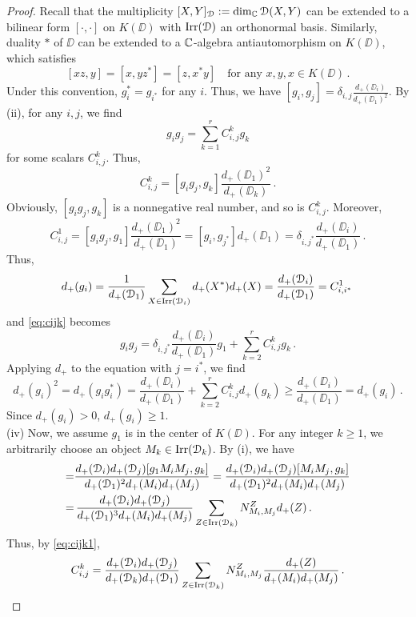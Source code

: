 \documentclass{amsart}
\begin{document}
\begin{proof}
 Recall that the multiplicity $[X,Y]_{\EuScript{D}} := \dim_{\mathbb{C}}{\EuScript{D}}(X,Y)$ can be extended to a bilinear form $[\cdot, \cdot]$ on $K(\DD)$ with $\operatorname{Irr}({\EuScript{D}})$ an orthonormal basis. Similarly,  duality $*$ of $\DD$ can be extended to a $\mathbb{C}$-algebra antiautomorphism on $K(\DD)$, which satisfies
$$
[xz,y] = [x, yz^*] = [z, x^* y] \quad \text{for any }x,y, x \in K(\DD)\,.
$$
Under this convention, $g_i^* = g_{i^*}$ for any $i$. Thus, we have $[g_i, g_j] = \delta_{i,j}\frac{{d_+}(\DD_i)}{{d_+}(\DD_1)^2}$. By (ii), for any $i,j$, we find
\begin{equation} \label{eq:cijk}
g_i g_j = \sum_{k=1}^r C_{i,j}^k g_k
\end{equation}
for some scalars $C_{i,j}^k$. Thus, 
\begin{equation}\label{eq:cijk1}
C_{i,j}^k = [g_i g_j, g_k] \frac{{d_+}(\DD_1)^2} {{d_+}(\DD_k)}\,. 
\end{equation}
Obviously, $[g_i g_j, g_k]$ is a nonnegative real number, and so is $C_{i,j}^k$. Moreover,
\begin{equation} \label{eq:cijk2}
C_{i,j}^1 = [g_i g_j, g_1] \frac{{d_+}(\DD_1)^2} {{d_+}(\DD_1)} =  [g_i, g_{j^*}] {d_+}(\DD_1) = \delta_{i,j^*}\frac{{d_+}(\DD_i)}{{d_+}(\DD_1)}\,.
\end{equation}
Thus, 
$$
d_+(g_i) = \frac{1}{d_+({\EuScript{D}}_1)}\sum_{X \in \operatorname{Irr}({\EuScript{D}}_i)} d_+(X^*)d_+(X) =\frac{d_+({\EuScript{D}}_i)}{d_+({\EuScript{D}}_1)} = C_{i,i^*}^1\,
$$
and  \eqref{eq:cijk} becomes
$$
g_i g_j = \delta_{i, j^*} \frac{{d_+}(\DD_i)}{{d_+}(\DD_1)} g_1+ \sum_{k=2}^r C_{i,j}^k g_k\,.
$$
Applying $d_+$ to the equation with $j=i^*$, we find
$$
d_+(g_i)^2 = d_+(g_i g_i^*) =  \frac{{d_+}(\DD_i)}{{d_+}(\DD_1)} + \sum_{k=2}^r C_{i,j}^k d_+(g_k) \ge \frac{{d_+}(\DD_i)}{{d_+}(\DD_1)}=d_+(g_i) \,.
$$
Since $d_+(g_i) >0$, $d_+(g_i) \ge 1$.\\
(iv) Now, we assume $g_1$ is in the center of $K(\DD)$. For any integer $k \ge 1$, we arbitrarily  choose an object $M_k \in \operatorname{Irr}({\EuScript{D}}_k)$. By (i), we have
    \begin{align*}
        [g_{i} g_j, g_k] = &\frac{{d_+}(\DD_i){d_+}(\DD_j)[g_1 M_i M_j, g_k]}{{d_+}(\DD_1)^2{d_+}(M_i){d_+}(M_j)} 
        =  \frac{{d_+}(\DD_i){d_+}(\DD_j)[ M_i M_j, g_k]}{{d_+}(\DD_1)^2{d_+}(M_i){d_+}(M_j)} \\
        = &\, \frac{{d_+}(\DD_i){d_+}(\DD_j)}{{d_+}(\DD_1)^3{d_+}(M_i){d_+}(M_j)} \sum_{Z \in \irr(\DD_k)}N_{M_i, M_j}^Z {d_+}(Z)\,.
    \end{align*}
 Thus, by \eqref{eq:cijk1},
 \begin{equation} \label{eq:cijk3}
 C_{i,j}^k =\frac{{d_+}(\DD_i){d_+}(\DD_j)}{{d_+}(\DD_k){d_+}(\DD_1)}\sum_{Z \in \irr(\DD_k)} N_{M_i, M_j}^Z \frac{{d_+}(Z)}{{d_+}(M_i){d_+}(M_j)}\,.

\end{equation}
\end{proof}
\end{document}
